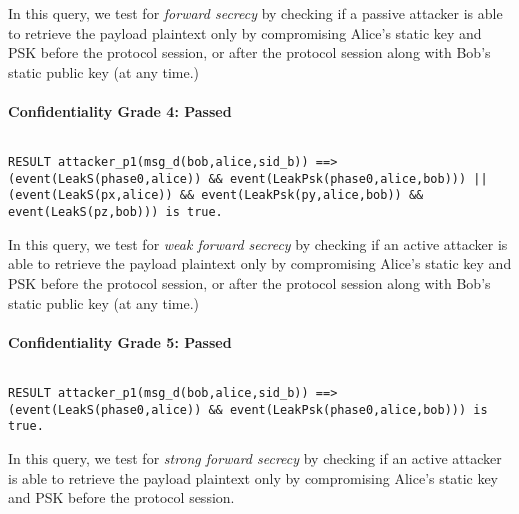 In this query, we test for \emph{forward secrecy} by checking if a passive attacker is able to retrieve the payload plaintext only by compromising Alice's static key and PSK before the protocol session, or after the protocol session along with Bob's static public key (at any time.)


\paragraph{Confidentiality Grade 4: Passed}$ $
\begin{lstlisting}
RESULT attacker_p1(msg_d(bob,alice,sid_b)) ==> (event(LeakS(phase0,alice)) && event(LeakPsk(phase0,alice,bob))) || (event(LeakS(px,alice)) && event(LeakPsk(py,alice,bob)) && event(LeakS(pz,bob))) is true.
\end{lstlisting}

In this query, we test for \emph{weak forward secrecy} by checking if an active attacker is able to retrieve the payload plaintext only by compromising Alice's static key and PSK before the protocol session, or after the protocol session along with Bob's static public key (at any time.)


\paragraph{Confidentiality Grade 5: Passed}$ $
\begin{lstlisting}
RESULT attacker_p1(msg_d(bob,alice,sid_b)) ==> (event(LeakS(phase0,alice)) && event(LeakPsk(phase0,alice,bob))) is true.
\end{lstlisting}

In this query, we test for \emph{strong forward secrecy} by checking if an active attacker is able to retrieve the payload plaintext only by compromising Alice's static key and PSK before the protocol session.


